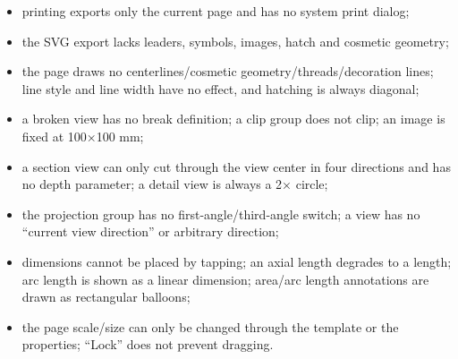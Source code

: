 \begin{itemize}
  \item printing exports only the current page and has no system print dialog;
  \item the SVG export lacks leaders, symbols, images, hatch and cosmetic geometry;
  \item the page draws no centerlines/cosmetic geometry/threads/decoration lines; line style and
        line width have no effect, and hatching is always diagonal;
  \item a broken view has no break definition; a clip group does not clip; an image is fixed at
        100×100 mm;
  \item a section view can only cut through the view center in four directions and has no depth
        parameter; a detail view is always a 2× circle;
  \item the projection group has no first-angle/third-angle switch; a view has no ``current view
        direction'' or arbitrary direction;
  \item dimensions cannot be placed by tapping; an axial length degrades to a length; arc length is
        shown as a linear dimension; area/arc length annotations are drawn as rectangular balloons;
  \item the page scale/size can only be changed through the template or the properties; ``Lock''
        does not prevent dragging.
\end{itemize}
